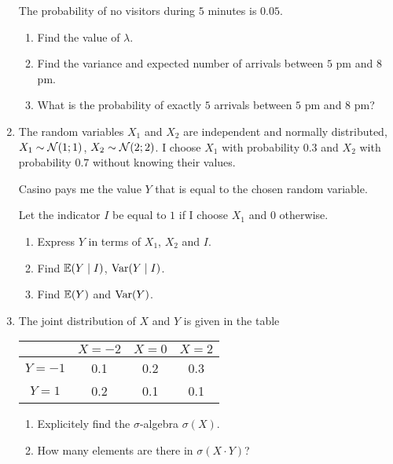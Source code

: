 \begin{enumerate}
  The probability of no visitors during $5$ minutes is $0.05$. 
  
  \begin{enumerate}
    \item Find the value of $\lambda$.
    \item Find the variance and expected number of arrivals between $5$ pm and $8$ pm. 
    \item What is the probability of exactly $5$ arrivals between $5$ pm and $8$ pm?
  \end{enumerate}

  \item 
  The random variables $X_1$ and $X_2$ are independent and normally distributed, 
  $X_1 \sim \mathcal{N}(1;1)$, $X_2 \sim \mathcal{N}(2;2)$. 
  I choose $X_1$ with probability $0.3$ and $X_2$ with probability $0.7$ without knowing their values.
  
  Casino pays me the value $Y$ that is equal to the chosen random variable. 

  Let the indicator $I$ be equal to $1$ if I choose $X_1$ and $0$ otherwise. 

  \begin{enumerate}
    \item Express $Y$ in terms of $X_1$, $X_2$ and $I$.
    \item Find $\operatorname{\mathbb{E}}(Y \mid I)$, $\operatorname{Var}(Y \mid I)$.
    \item Find $\operatorname{\mathbb{E}}(Y)$ and $\operatorname{Var}(Y)$. 
  \end{enumerate}

  \item The joint distribution of $X$ and $Y$ is given in the table
    
    \begin{tabular}{*{4}{c}}
    \toprule
    & $X=-2$ & $X=0$ & $X=2$ \\
    \midrule
    $Y=-1$ & 0.1 & 0.2 & 0.3  \\
    $Y=1$ & 0.2 & 0.1 & 0.1  \\
    \bottomrule
    \end{tabular}
    
    \begin{enumerate}
     \item Explicitely find the $\sigma$-algebra $\sigma(X)$.
     \item How many elements are there in $\sigma(X \cdot Y)$?
    \end{enumerate}
    
\end{enumerate} %


